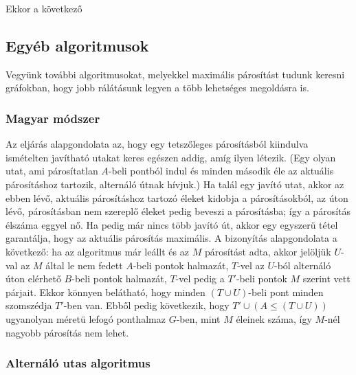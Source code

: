 \documentclass[12pt]{article}
\begin{document}
Ekkor a következő 
\pagebreak

\subsection{Egyéb algoritmusok}

Vegyünk további algoritmusokat, melyekkel maximális párosítást tudunk keresni gráfokban, hogy jobb rálátásunk legyen a több lehetséges megoldásra is.

\subsubsection{Magyar módszer}

Az eljárás alapgondolata az, hogy egy tetszőleges párosításból kiindulva ismételten javítható utakat keres egészen addig, amíg ilyen létezik. (Egy olyan utat, ami párosítatlan $A$-beli pontból indul és minden második éle az aktuális párosításhoz tartozik, alternáló útnak hívjuk.) Ha talál egy javító utat, akkor az ebben lévő, aktuális párosításhoz tartozó éleket kidobja a párosításokból, az úton lévő, párosításban nem szereplő éleket pedig beveszi a párosításba; így a párosítás élszáma eggyel
nő. Ha pedig már nincs több javító út, akkor egy egyszerü tétel garantálja, hogy az
aktuális párosítás maximális. A bizonyítás alapgondolata a következő: ha az algoritmus már leállt és az $M$ párosítást adta, akkor jelöljük $U$-val az $M$ által le nem
fedett $A$-beli pontok halmazát, $T$-vel az $U$-ból alternáló úton elérhető $B$-beli pontok halmazát, $T$-vel pedig a $T'$-beli pontok $M$ szerint vett párjait. Ekkor könnyen belátható, hogy minden $(T \cup U)$-beli pont minden szomszédja $T'$-ben van. Ebből pedig következik, hogy $T' \cup (A \leq (T \cup U))$ ugyanolyan méretü lefogó ponthalmaz $G$-ben, mint $M$ éleinek száma, így $M$-nél nagyobb párosítás nem lehet. ~\cite{frank2002magyar}\\ 


\subsubsection{Alternáló utas algoritmus}
\end{document}
